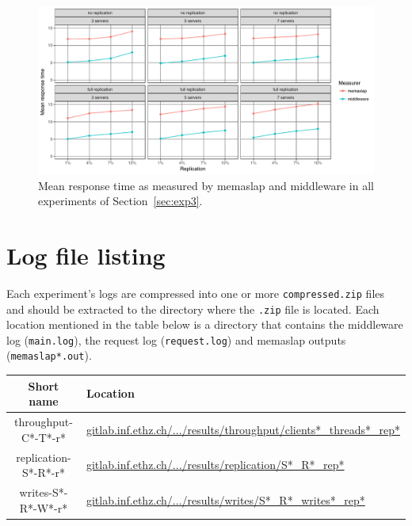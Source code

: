 \documentclass[11pt]{article}
\begin{document}
\begin{figure}[h]
\centering
\includegraphics[width=\textwidth]{../results/writes/graphs/compare_mw_ms.pdf}
\caption{Mean response time as measured by memaslap and middleware in all experiments of Section~\ref{sec:exp3}.}
\label{fig:appa:comparison:exp3}
\end{figure}



\clearpage

\section*{Log file listing}

Each experiment's logs are compressed into one or more \verb+compressed.zip+ files and should be extracted to the directory where the \verb+.zip+ file is located. Each location mentioned in the table below is a directory that contains the middleware log (\verb+main.log+), the request log (\verb+request.log+) and memaslap outputs (\verb+memaslap*.out+). \\

\begin{tabular}{|c|l|}
\hline \textbf{Short name}& \textbf{Location} \\ 
\hline throughput-C*-T*-r* & \href{https://gitlab.inf.ethz.ch/pungast/asl-fall16-project/blob/master/results/throughput}{gitlab.inf.ethz.ch/.../results/throughput/clients*\_threads*\_rep*} \\ 
\hline replication-S*-R*-r* & \href{https://gitlab.inf.ethz.ch/pungast/asl-fall16-project/blob/master/results/replication}{gitlab.inf.ethz.ch/.../results/replication/S*\_R*\_rep*} \\ 
\hline writes-S*-R*-W*-r* & \href{https://gitlab.inf.ethz.ch/pungast/asl-fall16-project/blob/master/results/writes}{gitlab.inf.ethz.ch/.../results/writes/S*\_R*\_writes*\_rep*} \\ 
\hline 
\end{tabular} 
 
\end{document}
